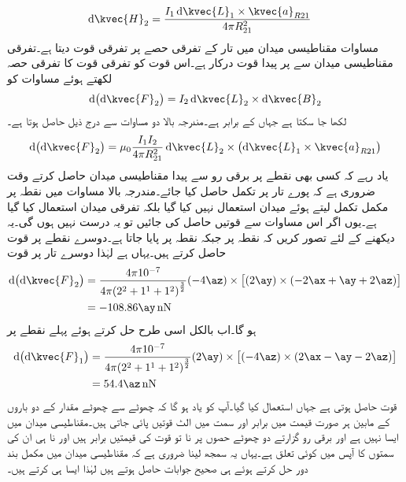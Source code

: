 \begin{align*}
\dif \kvec{H}_2&=\frac{I_1 \dif \kvec{L}_1 \times \kvec{a}_{R21}}{4 \pi R_{21}^2}
\end{align*}
مساوات  مقناطیسی میدان  میں تار کے تفرقی حصے پر تفرقی قوت دیتا ہے۔تفرقی مقناطیسی میدان  سے  پر  پیدا قوت درکار ہے۔اس قوت کو تفرقی قوت کا تفرقی حصہ  لکھتے ہوئے مساوات  کو 
\begin{align*}
\dif \left(\dif \kvec{F}_2 \right)=I_2 \dif \kvec{L}_2 \times \dif \kvec{B}_2
\end{align*}
لکھا جا سکتا ہے جہاں  کے برابر ہے۔مندرجہ بالا دو مساوات سے درج ذیل حاصل ہوتا ہے۔
\begin{align}\label{مساوات_امالہ_تفرقی_تفرقی_قوت}
\dif \left(\dif \kvec{F}_2 \right)=\mu_0 \frac{I_1 I_2}{4\pi R_{21}^2} \dif \kvec{L}_2 \times \left(\dif \kvec{L}_1 \times \kvec{a}_{R21} \right)
\end{align}
یاد رہے کہ کسی بھی نقطے پر برقی رو سے پیدا مقناطیسی میدان حاصل کرتے وقت ضروری ہے کہ پورے تار پر تکمل حاصل کیا جائے۔مندرجہ بالا مساوات میں نقطہ  پر مکمل تکمل لیتے ہوئے میدان  استعمال نہیں کیا گیا بلکہ تفرقی میدان  استعمال کیا گیا ہے۔یوں اگر اس مساوات سے قوتیں حاصل کی جائیں تو یہ درست نہیں ہوں گی۔یہ دیکھنے کے لئے تصور کریں کہ نقطہ  پر  جبکہ نقطہ  پر  پایا جاتا ہے۔دوسرے نقطے پر قوت حاصل کرتے ہیں۔یہاں  ہے لہٰذا دوسرے تار پر قوت
\begin{align*}
\dif \left(\dif \kvec{F}_2 \right)&= \frac{4 \pi 10^{-7}}{4\pi {\left(2^2+1^1+1^2\right)}^\frac{3}{2}} (-4\az) \times \left[(2\ay) \times \left( -2\ax+\ay+2\az \right) \right]\\
&=-108.86 \ay \, \si{\nano \newton}
\end{align*}
ہو گا۔اب بالکل اسی طرح حل کرتے ہوئے پہلے نقطے پر
\begin{align*}
\dif \left(\dif \kvec{F}_1 \right)&= \frac{4 \pi 10^{-7}}{4\pi {\left(2^2+1^1+1^2\right)}^\frac{3}{2}} (2\ay)  \times \left[(-4\az)\times \left( 2\ax-\ay-2\az \right) \right]\\
&=54.4 \az \, \si{\nano \newton}
\end{align*}
 قوت حاصل ہوتی ہے جہاں  استعمال کیا گیا۔آپ کو یاد ہو گا کہ  چھوٹے سے چھوٹے مقدار کے دو باروں کے مابین ہر صورت قیمت میں برابر اور سمت میں الٹ قوتیں پائی جاتی ہیں۔مقناطیسی میدان میں ایسا نہیں ہے اور برقی رو گزارتے دو چھوٹے حصوں پر نا تو قوت کی قیمتیں برابر ہیں اور نا ہی ان کی سمتوں کا آپس میں کوئی تعلق ہے۔یہاں یہ سمجھ لینا ضروری ہے کہ مقناطیسی میدان میں مکمل بند دور حل کرتے ہوئے ہی صحیح جوابات حاصل ہوتے ہیں لہٰذا ایسا ہی کرتے ہیں۔

